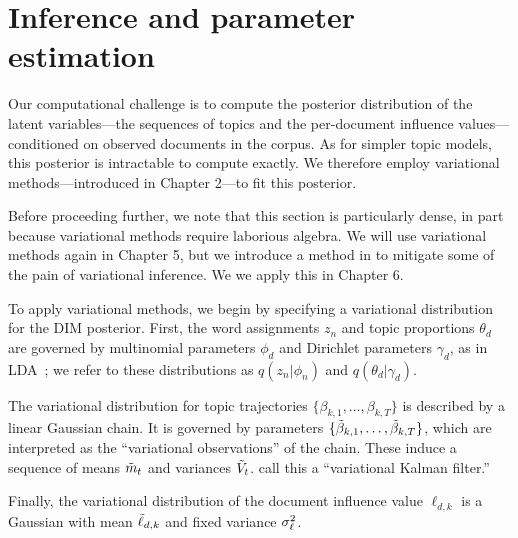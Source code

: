\section{Inference and parameter estimation}
\label{section:inference}

Our computational challenge is to compute the posterior distribution
of the latent variables---the sequences of topics and the per-document
influence values---conditioned on observed documents in the corpus.
As for simpler topic models, this posterior is intractable to compute
exactly. We therefore employ variational methods---introduced in
Chapter 2---to fit this posterior.

Before proceeding further, we note that this section is particularly
dense, in part because variational methods require laborious algebra.
We will use variational methods again in Chapter 5, but we introduce a
method in  to
mitigate some of the pain of variational inference.  We we apply this
in Chapter 6.

To apply variational methods, we begin by specifying a variational
distribution for the DIM posterior.  First, the word assignments $z_n$
and topic proportions $\theta_d$ are governed by multinomial
parameters $\phi_d$ and Dirichlet parameters $\gamma_d$, as in
LDA~\citep{blei:2003}; we refer to these distributions as $q(z_n |
\phi_n)$ and $q(\theta_d | \gamma_d)$.

The variational distribution for topic trajectories
$\{\beta_{k,1}, \ldots, \beta_{k,T} \}$ is described by a linear
Gaussian chain.  It is governed by parameters $\{ \tilde{\beta}_{k,1}, \ldots,
\tilde{\beta}_{k,T} \}$, which are interpreted as the ``variational
observations'' of the chain.  These induce a sequence of means $\tilde{m}_t$
and variances $\tilde{V}_t$. \cite{blei:2006} call this a ``variational
Kalman filter.''

Finally, the variational distribution of the document influence value
$\ell_{d,k}$ is a Gaussian with mean $\tilde{\ell}_{d,k}$ and fixed variance
$\sigma^2_{\ell}$.



